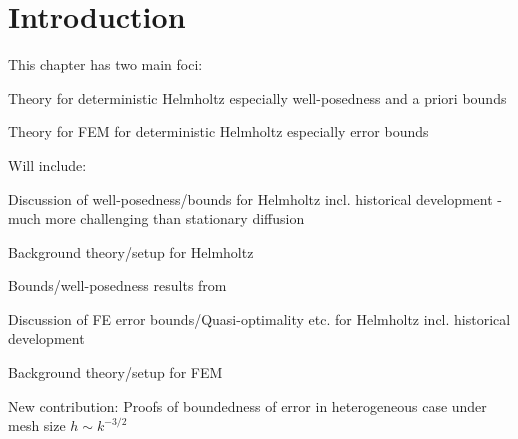 \section{Introduction}
This chapter has two main foci:
\ben
\item Theory for deterministic Helmholtz especially well-posedness and a priori bounds
\item Theory for FEM for deterministic Helmholtz especially error bounds
\een

Will include:
\bit
\item Discussion of well-posedness/bounds for Helmholtz incl. historical development - much more challenging than stationary diffusion
\item Background theory/setup for Helmholtz
\item Bounds/well-posedness results from \cite{GrPeSp:19}
\item Discussion of FE error bounds/Quasi-optimality etc. for Helmholtz incl. historical development
\item Background theory/setup for FEM
\item New contribution: Proofs of boundedness of error in heterogeneous case under mesh size $h \sim k^{-3/2}$
\eit

